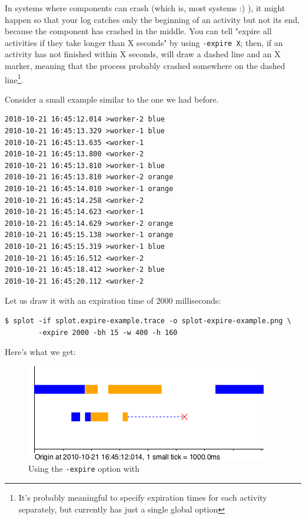 \documentclass{article}
\begin{document}
In systems where components can crash (which is, most systems :) ), it might happen so that your log catches only the beginning of an activity but not its end, because the component has crashed in the middle. You can tell \splot{} "expire all activities if they take longer than X seconds" by using \verb|-expire X|; then, if an activity has not finished within X seconds, \splot{} will draw a dashed line and an X marker, meaning that the process probably crashed somewhere on the dashed line\footnote{It's probably meaningful to specify expiration times for each activity separately, but currently \splot{} has just a single global option}.

Consider a small example similar to the one we had before.

\begin{verbatim}
2010-10-21 16:45:12.014 >worker-2 blue
2010-10-21 16:45:13.329 >worker-1 blue
2010-10-21 16:45:13.635 <worker-1
2010-10-21 16:45:13.800 <worker-2
2010-10-21 16:45:13.810 >worker-1 blue
2010-10-21 16:45:13.810 >worker-2 orange
2010-10-21 16:45:14.010 >worker-1 orange
2010-10-21 16:45:14.258 <worker-2
2010-10-21 16:45:14.623 <worker-1
2010-10-21 16:45:14.629 >worker-2 orange
2010-10-21 16:45:15.138 >worker-1 orange
2010-10-21 16:45:15.319 >worker-1 blue
2010-10-21 16:45:16.512 <worker-2
2010-10-21 16:45:18.412 >worker-2 blue
2010-10-21 16:45:20.112 <worker-2
\end{verbatim}

Let us draw it with an expiration time of 2000 milliseconds:

\begin{verbatim}
$ splot -if splot.expire-example.trace -o splot-expire-example.png \
        -expire 2000 -bh 15 -w 400 -h 160
\end{verbatim}

Here's what we get:

\begin{figure}[h!]
\center
\includegraphics[scale=0.5]{pics/splot/splot-expire-example.png}
\caption{Using the \texttt{-expire} option with \splot{}}
\end{figure}
\end{document}
